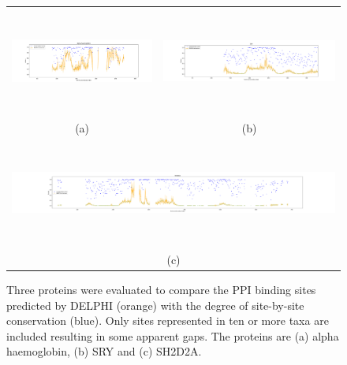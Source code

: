 \begin{figure}
\centering
\begin{tabular}{cc}
\includegraphics[height=3.5cm]{img/hemoglobin_top178_conservation.pdf} & 
\includegraphics[height=3.5cm]{img/SRY_conservation.pdf}\\
\small (a) & \small (b)\\
\multicolumn{2}{c}{\includegraphics[height=3.5cm]{img/SH2_conservation.pdf}}\\
\multicolumn{2}{c}{\small (c)}
\end{tabular}
  \caption[Comparison between DELPHI predictions and evolutionary conservation]{Three proteins were evaluated to compare the PPI binding sites predicted by DELPHI (orange) with the degree of site-by-site conservation (blue).  Only sites represented in ten or more taxa are included resulting in some apparent gaps.  The proteins are (a) alpha haemoglobin, (b) SRY and (c) SH2D2A.} 
  \label{fig_conservation_vs_sitePred}
\end{figure}


